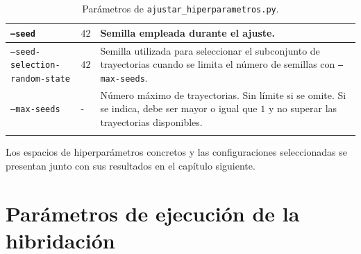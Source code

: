 \begin{longtable}[htbp]{|p{4.2cm}|p{2.2cm}|p{4.85cm}|}
    \texttt{--seed}
                       & \(42\)
                       & Semilla empleada durante el ajuste.                                                                  \\
    \hline

    \makecell[l]{\texttt{--seed-selection-}                                                                                   \\\texttt{random-state}}
                       & \(42\)
                       & Semilla utilizada para seleccionar el subconjunto de trayectorias
    cuando se limita el número de semillas con
    \texttt{--max-seeds}.                                                                                                     \\
    \hline

    \texttt{--max-seeds}
                       & -
                       & Número máximo de trayectorias. Sin límite si se omite. Si se indica, debe ser
    mayor o igual que \(1\) y no superar las trayectorias disponibles.                                                        \\
    \hline
    \caption{Parámetros de \texttt{ajustar\_hiperparametros.py}.}
    \label{tab:parametros_tuning_runner}
\end{longtable}

\endgroup

Los espacios de hiperparámetros
concretos y las configuraciones seleccionadas se presentan junto con sus
resultados en el capítulo siguiente.

\section{Parámetros de ejecución de la hibridación}


\clearpage
\begingroup
\setlength{\tabcolsep}{5pt}
\renewcommand{\arraystretch}{1.3}

